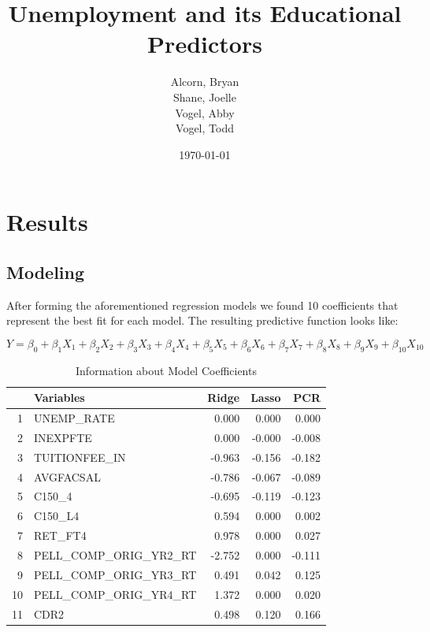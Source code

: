 \documentclass{article}\usepackage[]{graphicx}\usepackage[]{color}
\begin{document}
\title{Unemployment and its Educational Predictors}
\author{
Alcorn, Bryan\\
Shane, Joelle\\
Vogel, Abby\\
Vogel, Todd\\
}
\date{\today}

\maketitle
\section{Results}

\subsection{Modeling}
After forming the aforementioned regression models we found 10 coefficients that represent the best fit for each model. The resulting predictive function looks like:

\begin{equation}
Y = \beta_0 + \beta_1 X_1 + \beta_2 X_2 + \beta_3 X_3 + \beta_4 X_4 + \beta_5 X_5 + \beta_6 X_6 + \beta_7 X_7 + \beta_8 X_8 + \beta_9 X_9 + \beta_{10} X_{10}
\end{equation}



\begin{center}
\begin{table}[ht]
\centering
\caption{Information about Model Coefficients} 
\begin{tabular}{rlrrr}
  \hline
 & Variables & Ridge & Lasso & PCR \\ 
  \hline
1 & UNEMP\_RATE & 0.000 & 0.000 & 0.000 \\ 
  2 & INEXPFTE & 0.000 & -0.000 & -0.008 \\ 
  3 & TUITIONFEE\_IN & -0.963 & -0.156 & -0.182 \\ 
  4 & AVGFACSAL & -0.786 & -0.067 & -0.089 \\ 
  5 & C150\_4 & -0.695 & -0.119 & -0.123 \\ 
  6 & C150\_L4 & 0.594 & 0.000 & 0.002 \\ 
  7 & RET\_FT4 & 0.978 & 0.000 & 0.027 \\ 
  8 & PELL\_COMP\_ORIG\_YR2\_RT & -2.752 & 0.000 & -0.111 \\ 
  9 & PELL\_COMP\_ORIG\_YR3\_RT & 0.491 & 0.042 & 0.125 \\ 
  10 & PELL\_COMP\_ORIG\_YR4\_RT & 1.372 & 0.000 & 0.020 \\ 
  11 & CDR2 & 0.498 & 0.120 & 0.166 \\ 
   \hline
\end{tabular}
\end{table}

\end{center}
\end{document}
